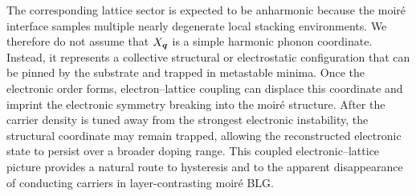 \documentclass[aps,prx,article,twocolumn,amsmath,amssymb,superscriptaddress,longbibliography]{revtex4-2}
\begin{document}
The corresponding lattice sector is expected to be anharmonic because the moiré interface samples multiple nearly degenerate local stacking environments. We therefore do not assume that $X_{\vb*{q}}$ is a simple harmonic phonon coordinate. Instead, it represents a collective structural or electrostatic configuration that can be pinned by the substrate and trapped in metastable minima. Once the electronic order forms, electron--lattice coupling can displace this coordinate and imprint the electronic symmetry breaking into the moiré structure. After the carrier density is tuned away from the strongest electronic instability, the structural coordinate may remain trapped, allowing the reconstructed electronic state to persist over a broader doping range. This coupled electronic--lattice picture provides a natural route to hysteresis and to the apparent disappearance of conducting carriers in layer-contrasting moiré BLG.


















\section{}







\end{document}
